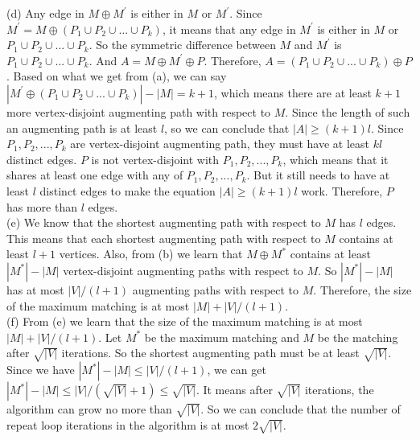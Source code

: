 \documentclass{article}
\begin{document}
(d) Any edge in $M\oplus M^{'}$ is either in $M$ or $M^{'}$. Since $M^{'} = M\oplus (P_1\cup P_2\cup ... \cup P_k)$, it means that any edge in $M^{'}$ is either in $M$ or $P_1\cup P_2\cup ... \cup P_k$. So the symmetric difference between $M$ and $M^{'}$ is $P_1\cup P_2\cup ... \cup P_k$. And $A = M\oplus M^{'}\oplus P$. Therefore, $A = (P_1\cup P_2\cup ... \cup P_k)\oplus P$.  Based on what we get from (a), we can say $|M^{'}\oplus (P_1\cup P_2\cup ... \cup P_k)| - |M| = k + 1$, which means there are at least $k + 1$ more vertex-disjoint augmenting path with respect to $M$. Since the length of such an augmenting path is at least $l$, so we can conclude that $|A| \geq (k + 1)l$. Since $P_1, P_2, ... , P_k$ are vertex-disjoint augmenting path, they must have at least $kl$ distinct edges. $P$ is not vertex-disjoint with $P_1, P_2, ... , P_k$, which means that it shares at least one edge with any of $P_1, P_2, ... , P_k$. But it still needs to have at least $l$ distinct edges to make the equation $|A| \geq (k + 1)l$ work. Therefore, $P$ has more than $l$ edges.\\\newline
(e) We know that the shortest augmenting path with respect to $M$ has $l$ edges. This means that each shortest augmenting path with respect to $M$ contains at least $l + 1$ vertices. Also, from (b) we learn that $M\oplus M^{*}$ contains at least $|M^{*}| - |M|$ vertex-disjoint augmenting paths with respect to $M$. So $|M^{*}| - |M|$ has at most $|V|/(l + 1)$ augmenting paths with respect to $M$. Therefore, the size of the maximum matching is at most $|M| + |V|/(l + 1)$.\\ \newline
(f) From (e) we learn that the size of the maximum matching is at most $|M| + |V|/(l + 1)$. Let $M^{*}$ be the maximum matching and $M$ be the matching after $\sqrt{|V|}$ iterations. So the shortest augmenting path must be at least $\sqrt{|V|}$. Since we have $|M^{*}| - |M| \leq |V|/(l + 1)$, we can get $|M^{*}| - |M| \leq |V|/(\sqrt{|V|} + 1) \leq \sqrt{|V|}$. It means after $\sqrt{|V|}$ iterations, the algorithm can grow no more than $\sqrt{|V|}$. So we can conclude that the number of repeat loop iterations in the algorithm is at most $2\sqrt{|V|}$. \\ \newline
\end{document}
